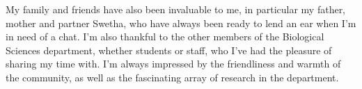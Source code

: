 My family and friends have also been invaluable to me, in particular my father, mother and partner Swetha, who have
always been ready to lend an ear when I'm in need of a chat. I'm also thankful to the other members of the Biological
Sciences department, whether students or staff, who I've had the pleasure of sharing my time with. I'm always impressed
by the friendliness and warmth of the community, as well as the fascinating array of research in the department.

\newpage

\cleardoublepage%
